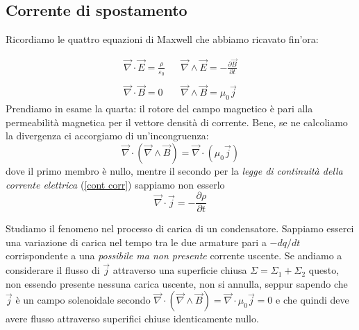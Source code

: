 \documentclass[x11names]{report}
\begin{document}
\subsection{Corrente di spostamento}
Ricordiamo le quattro equazioni di Maxwell che abbiamo ricavato fin'ora:

\[
\begin{array}{ccc}
	\vec{\nabla}\cdot \vec{E} = \frac{\rho}{\varepsilon_0} & & \vec{\nabla}\wedge \vec{E} = -\frac{\partial \vec{B}}{\partial t} \\ \\
	\vec{\nabla}\cdot \vec{B} = 0 & & \vec{\nabla}\wedge \vec{B} = \mu_0 \vec{j}
\end{array}
\]
Prendiamo in esame la quarta: il rotore del campo magnetico è pari alla permeabilità magnetica per il vettore densità di corrente. Bene, se ne calcoliamo la divergenza ci accorgiamo di un'incongruenza:
\[
\vec{\nabla}\cdot\left(\vec{\nabla}\wedge \vec{B}\right) = \vec{\nabla}\cdot\left(\mu_0 \vec{j}\right) 
\]
dove il primo membro è nullo, mentre il secondo per la \textit{legge di continuità della corrente elettrica} (\ref{cont corr}) sappiamo non esserlo
\[
\vec{\nabla}\cdot \vec{j} = - \frac{\partial \rho}{\partial t}
\]

Studiamo il fenomeno nel processo di carica di un condensatore. Sappiamo esserci una variazione di carica nel tempo tra le due armature pari a \(-dq/dt\) corrispondente a una \textit{possibile ma non presente} corrente uscente. Se andiamo a considerare il flusso di \(\vec{j}\) attraverso una superficie chiusa \(\Sigma = \Sigma_1 + \Sigma_2\) questo, non essendo presente nessuna carica uscente, non si annulla, seppur sapendo che \(\vec{j}\) è un campo solenoidale secondo \(\vec{\nabla}\cdot\left(\vec{\nabla}\wedge \vec{B}\right) = \vec{\nabla}\cdot\mu_0 \vec{j} = 0\) e che quindi deve avere flusso attraverso superifici chiuse identicamente nullo.


\begin{figure}[H]
	\centering
\end{figure}
\end{document}
